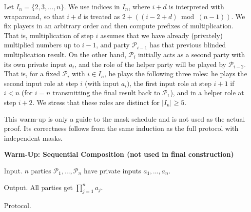 \documentclass[10pt,a4paper]{article}
\begin{document}
Let $I_{n}=\{2,3,\dots,n\}$. We use indices in $I_{n}$, where $i+d$ is interpreted with wraparound, so that $i+d$ is treated as $2+((i-2+d)\bmod(n-1))$. We fix players in an arbitrary order and then compute prefixes of multiplication. That is, multiplication of step $i$ assumes that we have already (privately) multiplied numbers up to $i-1$, and party
$\mathcal{P}_{i-1}$ has that previous blinded multiplication result. On the other hand, $\mathcal{P}_{i}$ initially acts as a second party with its own private input $a_{i}$, and the role of the helper party will be played by
$\mathcal{P}_{i-2}$. That is, for a fixed $\mathcal{P}_{i}$ with $i\in I_{n}$, he plays the following three roles: he plays the second input role at step $i$ (with input $a_{i})$, the first input role at step $i+1$ if $i<n$ (for $i=n$ transmitting the final result back to $\mathcal{P}_{1}$), and in a helper role at step $i+2$. We stress that these roles are distinct for $|I_{n}|\geq 5$.\par




This warm-up is only a guide to the mask schedule and is not used as the actual proof. Its correctness follows from the same induction as the full protocol with independent masks.\par





{\bfseries Warm-Up: Sequential Composition (not used in final construction)


Input.
$n$ parties $\mathcal{P}_{1},\dots,\mathcal{P}_{n}$ have private inputs $a_{1},\dots,a_{n}$.


Output. All parties get $\prod_{j=1}^{n}a_{j}$.


Protocol.}\par
\end{document}
